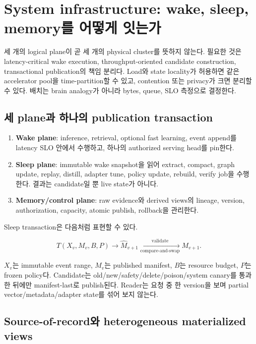 \chapter{System infrastructure: wake, sleep, memory를 어떻게 잇는가}
\label{STC-S13}

세 개의 logical plane이 곧 세 개의 physical cluster를 뜻하지 않는다. 필요한 것은 latency-critical wake
execution, throughput-oriented candidate construction, transactional publication의 책임 분리다. Load와
state locality가 허용하면 같은 accelerator pool을 time-partition할 수 있고, contention 또는 privacy가
크면 분리할 수 있다. 배치는 brain analogy가 아니라 bytes, queue, SLO 측정으로 결정한다.

\section{세 plane과 하나의 publication transaction}

\begin{enumerate}
  \item \textbf{Wake plane}: inference, retrieval, optional fast learning, event append를 latency SLO 안에서
  수행하고, 하나의 authorized serving head를 pin한다.
  \item \textbf{Sleep plane}: immutable wake snapshot을 읽어 extract, compact, graph update, replay,
  distill, adapter tune, policy update, rebuild, verify job을 수행한다. 결과는 candidate일 뿐 live state가
  아니다.
  \item \textbf{Memory/control plane}: raw evidence와 derived views의 lineage, version, authorization,
  capacity, atomic publish, rollback을 관리한다.
\end{enumerate}

Sleep transaction은 다음처럼 표현할 수 있다.

\begin{equation}
T(X_v,M_v,B,P)\rightarrow \widehat M_{v+1}
\xrightarrow[\text{compare-and-swap}]{\text{validate}} M_{v+1}.
\label{eq:sleep-transaction}
\end{equation}

$X_v$는 immutable event range, $M_v$는 published manifest, $B$는 resource budget, $P$는 frozen policy다.
Candidate는 old/new/safety/delete/poison/system canary를 통과한 뒤에만 manifest-last로 publish된다.
Reader는 요청 중 한 version을 보며 partial vector/metadata/adapter state를 섞어 보지 않는다.

\section{Source-of-record와 heterogeneous materialized views}

